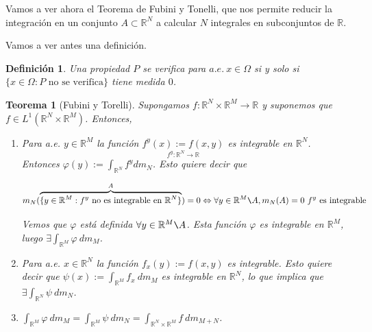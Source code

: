 \documentclass[11pt, a4paper]{article}
\newif\IfInSansMode
\newcommand{\R}{\mathbb{R}} \newcommand{\N}{\mathbb{N}}
\theoremstyle{theorem-style}
\newtheorem{nth}{Teorema}[section]
\theoremstyle{definition-style}
\newtheorem{ndef}{Definición}[section]
\theoremstyle{remark-style}
\theoremstyle{example-style}
\begin{document}
Vamos a ver ahora el Teorema de Fubini y Tonelli, que nos permite reducir la integración en un
conjunto $A \subset \R^N$ a calcular $N$ integrales en
subconjuntos de $\R$.

Vamos a ver antes una definición.

\begin{ndef}
  Una propiedad $P$ se verifica para $a.e.\ x \in \Omega$ si y solo si $\{ x \in
  \Omega : P \text{ no se verifica} \}$ tiene medida $0$.
\end{ndef}


\begin{nth}[Fubini y Torelli]
Supongamos $f: \R^N \times \R^M \rightarrow \R$ y suponemos que $f \in L^1(\R^N
\times \R^M)$. Entonces,

\begin{enumerate}
\item Para a.e. $y \in \R^M$ la función $\underset{  f^y: \R^N \to \R }{f^y(x) := f(x,y)}$ es integrable en $\R^N$. Entonces $\displaystyle \varphi(y) := \int_{\R^N}f^y dm_N$. Esto quiere decir que

  $$m_N
  ( \overbrace{\{ y \in
  \R^M : f^y \text{ no es integrable en } \R^N \}}^{A}) = 0 \Leftrightarrow \forall y
  \in \R^M \verb+\+ A, m_N(A) =0\ f^y \text{ es integrable}$$

  Vemos que $\varphi$ está definida $\forall y \in \R^M \verb+\+ A$. Esta función
  $\varphi$ es integrable en $\R^M$, luego $\exists \int_{\R^M} \varphi \ dm_M$.
\item Para a.e. $x \in \R^N$ la función $f_x(y) := f(x,y)$ es integrable. Esto
  quiere decir que $\psi (x) := \displaystyle \int_{\R^M} f_x \ dm_M$ es
  integrable en $\R^N$, lo que implica que $\exists \displaystyle \int_{\R^N}\psi
  \ dm_N$.
\item $\displaystyle\int_{\R^M} \varphi \ dm_M = \displaystyle\int_{\R^M} \psi \ dm_N = \displaystyle\int_{\R^N \times \R^M} f
  \ dm_{M + N}$.
\end{enumerate}
\end{nth}
\end{document}
